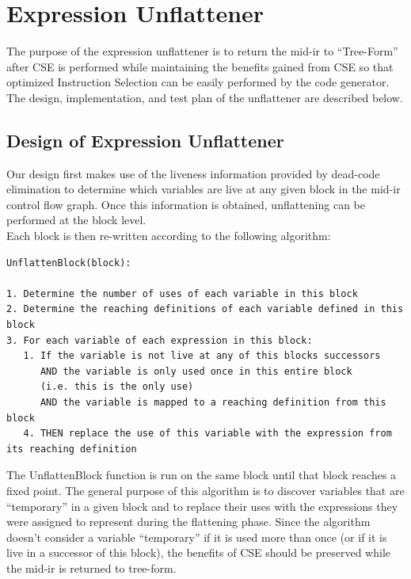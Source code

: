 \documentclass[11pt]{article}
\begin{document}
\section {Expression Unflattener}

The purpose of the expression unflattener is to return the mid-ir to
``Tree-Form'' after CSE is performed while maintaining the benefits
gained from CSE so that optimized Instruction Selection can be easily
performed by the code generator. The design, implementation, and test
plan of the unflattener are described below.

\subsection{Design of Expression Unflattener}

Our design first makes use of the liveness information
provided by dead-code elimination to determine which variables are
live at any given block in the mid-ir control flow graph. Once this
information is obtained, unflattening can be performed at the block
level.\\


\noindent Each block is then re-written according to the following algorithm: 

\begin{verbatim}
UnflattenBlock(block):

1. Determine the number of uses of each variable in this block 
2. Determine the reaching definitions of each variable defined in this
block
3. For each variable of each expression in this block: 
   1. If the variable is not live at any of this blocks successors 
      AND the variable is only used once in this entire block 
      (i.e. this is the only use)
      AND the variable is mapped to a reaching definition from this block 
   4. THEN replace the use of this variable with the expression from
its reaching definition
\end{verbatim}

\noindent The UnflattenBlock function is run on the same block until that block
reaches a fixed point. The general purpose of this algorithm is to
discover variables that are ``temporary'' in a given block and to replace
their uses with the expressions they were assigned to represent during
the flattening phase. Since the algorithm doesn't consider a variable
``temporary'' if it is used more than once (or if it is live in a
successor of this block), the benefits of CSE should be preserved
while the mid-ir is returned to tree-form. 
\end{document}
